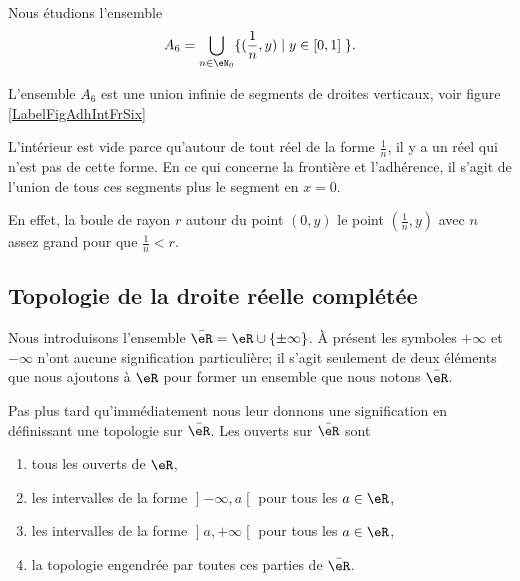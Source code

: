 \begin{example}\label{ItemexoEspVectoNorme0003iv}
    Nous étudions l'ensemble
    \begin{equation}
        A_6 = \bigcup _{ n \in \eN_0} \{ ( \frac 1n, y ) \; | \; y \in [0,1] \; \}.
    \end{equation}

			L'ensemble $A_6$ est une union infinie de segments de droites verticaux, voir figure \ref{LabelFigAdhIntFrSix}
\newcommand{\CaptionFigAdhIntFrSix}{Le segment sur l'axe vertical entre $y=0$ et $y=1$ fait partie de l'adhérence et de la frontière, mais pas de l'ensemble $A_6$ lui-même.}

				L'intérieur est vide parce qu'autour de tout réel de la forme $\frac{1}{ n }$, il y a un réel qui n'est pas de cette forme. En ce qui concerne la frontière et l'adhérence, il s'agit de l'union de tous ces segments plus le segment en $x=0$.

			En effet, la boule de rayon $r$ autour du point $(0,y)$ le point $(\frac{1}{ n },y)$ avec $n$ assez grand pour que $\frac{1}{ n }<r$.
\end{example}


\subsection{Topologie de la droite réelle complétée}
\label{SUBSECooKRRUooSlZSmM}

Nous introduisons l'ensemble \( \bar\eR=\eR\cup\{ \pm\infty \}\). À présent les symboles \( +\infty\) et \( -\infty\) n'ont aucune signification particulière; il s'agit seulement de deux éléments que nous ajoutons à \( \eR\) pour former un ensemble que nous notons \( \bar \eR\).

Pas plus tard qu'immédiatement nous leur donnons une signification en définissant une topologie sur \( \bar\eR\). Les ouverts sur \( \bar \eR\) sont
\begin{enumerate}
    \item
        tous les ouverts de \( \eR\),
    \item
        les intervalles de la forme \( \mathopen] -\infty , a \mathclose[\) pour tous les \( a\in \eR\),
    \item
        les intervalles de la forme \( \mathopen] a , +\infty \mathclose[\) pour tous les \( a\in \eR\),
    \item
        la topologie engendrée par toutes ces parties de \( \bar \eR\).
\end{enumerate}

